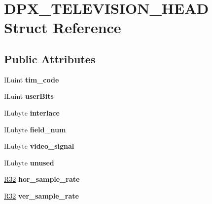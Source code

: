 \hypertarget{structDPX__TELEVISION__HEAD}{}\section{D\+P\+X\+\_\+\+T\+E\+L\+E\+V\+I\+S\+I\+O\+N\+\_\+\+H\+E\+AD Struct Reference}
\label{structDPX__TELEVISION__HEAD}
\subsection*{Public Attributes}
\begin{DoxyCompactItemize}
\item 
\mbox{\label{structDPX__TELEVISION__HEAD_acb332cae3b3fbfdc456f63f85c87c1e5}} 
I\+Luint {\bfseries tim\+\_\+code}
\item 
\mbox{\label{structDPX__TELEVISION__HEAD_ad416a5d80caed9bb2fc3f07fba22ccfa}} 
I\+Luint {\bfseries user\+Bits}
\item 
\mbox{\label{structDPX__TELEVISION__HEAD_afff076e6662a47f1fbfd136d90e06263}} 
I\+Lubyte {\bfseries interlace}
\item 
\mbox{\label{structDPX__TELEVISION__HEAD_a36ea884927a15174b1b308b9ec4f836c}} 
I\+Lubyte {\bfseries field\+\_\+num}
\item 
\mbox{\label{structDPX__TELEVISION__HEAD_a83fe0a536651b171cb5a12f1fd731306}} 
I\+Lubyte {\bfseries video\+\_\+signal}
\item 
\mbox{\label{structDPX__TELEVISION__HEAD_aa6a5b43a6830daa9e4b1c4a6089a4064}} 
I\+Lubyte {\bfseries unused}
\item 
\mbox{\label{structDPX__TELEVISION__HEAD_ab1d2e50a7b00385c32754728ec09c66f}} 
\hyperlink{structR32}{R32} {\bfseries hor\+\_\+sample\+\_\+rate}
\item 
\mbox{\label{structDPX__TELEVISION__HEAD_a87c2405b6b680c6ba114d237832d4c90}} 
\hyperlink{structR32}{R32} {\bfseries ver\+\_\+sample\+\_\+rate}

\end{DoxyCompactItemize}
